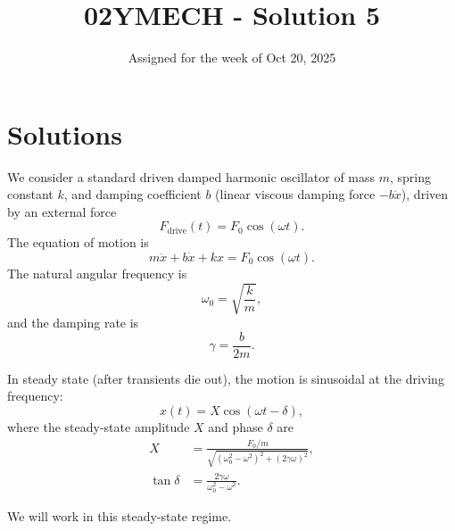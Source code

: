 \documentclass[12pt]{article}
\title{02YMECH - Solution 5}
\date{Assigned for the week of Oct 20, 2025}
\author{}
\begin{document}
\maketitle

\section*{Solutions}

We consider a standard driven damped harmonic oscillator of mass $m$, spring constant $k$, and damping coefficient $b$ (linear viscous damping force $-b\dot{x}$), driven by an external force
\[
F_\text{drive}(t) = F_0 \cos(\omega t).
\]
The equation of motion is
\begin{equation}
m \ddot{x} + b \dot{x} + k x = F_0 \cos(\omega t).
\label{eq:eom}
\end{equation}
The natural angular frequency is
\[
\omega_0 = \sqrt{\frac{k}{m}},
\]
and the damping rate is
\[
\gamma = \frac{b}{2m}.
\]

In steady state (after transients die out), the motion is sinusoidal at the driving frequency:
\begin{equation}
x(t) = X \cos(\omega t - \delta),
\label{eq:x_of_t}
\end{equation}
where the steady-state amplitude $X$ and phase $\delta$ are
\begin{align}
X &= \frac{F_0/m}{\sqrt{(\omega_0^2 - \omega^2)^2 + (2\gamma \omega)^2}}, \\
\tan \delta &= \frac{2\gamma \omega}{\omega_0^2 - \omega^2}.
\end{align}

We will work in this steady-state regime.
\end{document}
